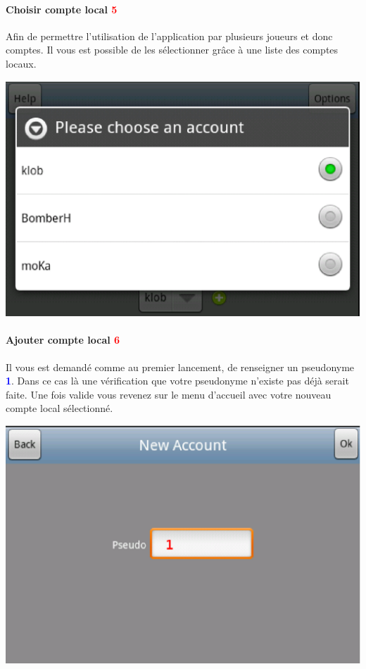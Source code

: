 			
\paragraph{Choisir compte local \textcolor{red}{5}\\}
	Afin de permettre l'utilisation de l'application par plusieurs joueurs et donc
	comptes. Il vous est possible de les sélectionner grâce à une liste des comptes
	locaux. 
	\begin{center}
		\includegraphics[scale=0.5]{Manuel/Img/8.eps}
	\end{center}

\paragraph{Ajouter compte local \textcolor{red}{6}\\}
	Il vous est demandé comme au premier lancement, de renseigner un pseudonyme 
	\textcolor{blue}{\textbf{1}}. Dans ce cas là une vérification que votre
	pseudonyme n'existe pas déjà serait faite. Une fois valide vous revenez sur le menu d'accueil avec votre
	nouveau compte local sélectionné.
	\begin{center}
		\includegraphics[scale=0.6]{Manuel/Img/9.eps}
	\end{center}
	
	